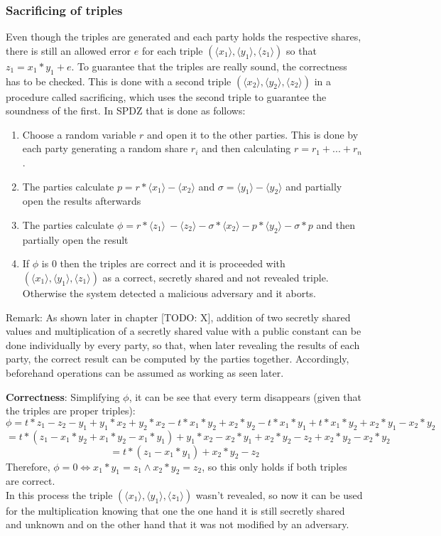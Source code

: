 \documentclass[english,runningheads,a4paper]{llncs}[2018/03/10]
\begin{document}
\subsubsection{Sacrificing of triples}
Even though the triples are generated and each party holds the respective shares, there is still an allowed error \(e\) for each triple \( (\langle x_1 \rangle ,\langle y_1\rangle , \langle z_1\rangle )\) so that \(z_1=x_1*y_1+e\). To guarantee that the triples are really sound, the correctness has to be checked. This is done with a second triple \( (\langle x_2 \rangle ,\langle y_2\rangle ,\langle z_2\rangle )\) in a procedure called sacrificing, which uses the second triple to guarantee the soundness of the first. In SPDZ that is done as follows:\\
\begin{enumerate}
\item Choose a random variable \( r\) and open it to the other parties. This is done by each party generating a random share \(r_i\) and then calculating \(r=r_1+...+r_n\).
\item The parties calculate  \( p=r*\langle x_1 \rangle - \langle x_2 \rangle \) and \( \sigma=\langle y_1 \rangle -  \langle y_2 \rangle \) and partially open the results afterwards
\item The parties calculate \(\phi = r * \langle z_1 \rangle\ - \langle z_2 \rangle - \sigma * \langle x_2 \rangle - p * \langle y_2 \rangle - \sigma * p\) and then partially open the result
\item If \( \phi \) is 0 then the triples are correct and it is proceeded with \( (\langle x_1 \rangle ,\langle y_1\rangle , \langle z_1\rangle )\) as a correct, secretly shared and not revealed triple. Otherwise the system detected a malicious adversary and it aborts.\\
\end{enumerate}

Remark: As shown later in chapter [TODO: X], addition of two secretly shared values and multiplication of a secretly shared value with a public constant can be done individually by every party, so that, when later revealing the results of each party, the correct result can be computed by the parties together. Accordingly, beforehand operations can be assumed as working as seen later.

\textbf{Correctness}: Simplifying \( \phi \), it can be see that every term disappears (given that the triples are proper triples):
$$\phi = t*z_1 - z_2 - y_1 + y_1*x_2 + y_2 * x_2 - t * x_1 * y_2 + x_2*y_2 - t*x_1*y_1 + t*x_1*y_2 + x_2*y_1 - x_2*y_2$$
$$ = t*(z_1 - x_1*y_2+x_1*y_2 -x_1*y_1) + y_1*x_2 - x_2*y_1+ x_2*y_2 - z_2 + x_2*y_2 -  x_2*y_2$$
$$= t* (z_1 - x_1*y_1) + x_2*y_2 - z_2 $$
Therefore, \( \phi = 0 \Leftrightarrow x_1 * y_1 = z_1 \land x_2*y_2=z_2 \), so this only holds if both triples are correct. \\
In this process the triple \( (\langle x_1 \rangle ,\langle y_1\rangle , \langle z_1\rangle ) \) wasn't revealed, so now it can be used for the multiplication knowing that one the one hand it is still secretly shared and unknown and on the other hand that it was not modified by an adversary.\\
\end{document}
